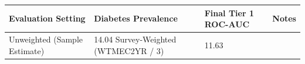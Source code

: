 \begin{tabular}{llll}
\toprule
Evaluation Setting & Diabetes Prevalence & Final Tier 1 ROC-AUC & Notes \\
\midrule
Unweighted (Sample Estimate) & 14.04%
Survey-Weighted (WTMEC2YR / 3) & 11.63%
\bottomrule
\end{tabular}
